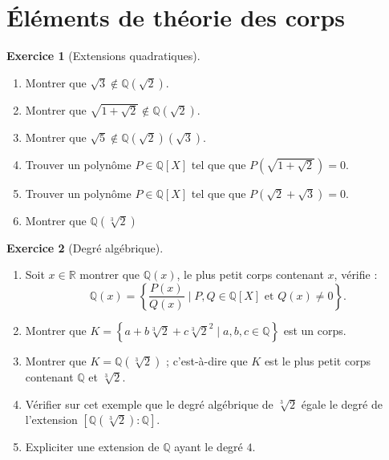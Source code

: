 \documentclass[11pt,a4paper]{article}
\newcommand{\Qq}{\mathbb{Q}} \newcommand{\Q}{\mathbb{Q}}
\newcommand{\Rr}{\mathbb{R}} \newcommand{\R}{\mathbb{R}}
\theoremstyle{definition}
\newtheorem{exo}{Exercice}
\newcommand{\exercice}[1]{} \newcommand{\finexercice}{}
\newcommand{\enonce}{\begin{exo}} \newcommand{\finenonce}{\end{exo}}
\begin{document}
\finexercice

\section{\'Eléments de théorie des corps}


\exercice{}
\enonce[Extensions quadratiques]
\begin{enumerate}
  \item Montrer que $\sqrt{3} \notin \Qq(\sqrt2)$.
  \item Montrer que $\sqrt{1+\sqrt2} \notin \Qq(\sqrt2)$.
  \item Montrer que $\sqrt 5 \notin \Qq(\sqrt2)(\sqrt 3)$.
  \item Trouver un polynôme $P \in \Qq[X]$ tel que que $P(\sqrt{1+\sqrt2}) = 0$.   
  \item Trouver un polynôme $P \in \Qq[X]$ tel que que $P(\sqrt2 + \sqrt 3) = 0$. 
  \item Montrer que $\Qq(\sqrt[3]{2})$ 
\end{enumerate}
\finenonce
\finexercice


\exercice{}
\enonce[Degré algébrique]

\begin{enumerate}
  \item Soit $x \in \Rr$ montrer que $\Qq(x)$, le plus petit corps contenant $x$, vérifie :
  $$\Qq(x) =\left\{ \frac{P(x)}{Q(x)} \mid P,Q \in \Qq[X] \text{ et } Q(x) \neq 0 \right\}.$$
  
  \item Montrer que $K = \left\{ a+b\sqrt[3]{2}+c\sqrt[3]{2}^2 \mid a,b,c \in \Qq \right\}$ est un corps.
  
  \item Montrer que  $K=\Qq(\sqrt[3]{2})$ ; c'est-à-dire que $K$ est le 
  plus petit corps contenant $\Qq$ et $\sqrt[3]{2}$.
  
  \item Vérifier sur cet exemple que le degré algébrique de $\sqrt[3]{2}$ égale 
  le degré de l'extension $[\Qq(\sqrt[3]{2}):\Qq]$.
  
  \item Expliciter une extension de $\Qq$ ayant le degré $4$.
\end{enumerate}
\finenonce
\end{document}
